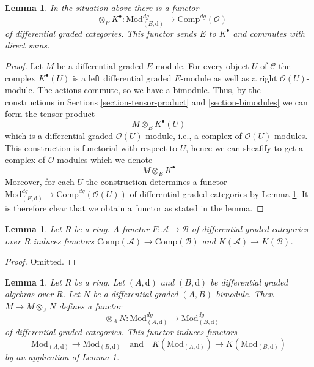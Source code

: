 \documentclass{stacks-project}
\theoremstyle{plain}
\newtheorem{lemma}[subsection]{Lemma}
\theoremstyle{definition}
\theoremstyle{remark}
\numberwithin{equation}{subsection}
\begin{document}
\begin{lemma}
\label{lemma-tensor-with-complex}
In the situation above there is a functor
$$
- \otimes_E K^\bullet :
\text{Mod}^{dg}_{(E, \text{d})}
\longrightarrow
\text{Comp}^{dg}(\mathcal{O})
$$
of differential graded categories. This functor sends $E$ to $K^\bullet$
and commutes with direct sums.
\end{lemma}

\begin{proof}
Let $M$ be a differential graded $E$-module. For every object $U$ of
$\mathcal{C}$ the complex $K^\bullet(U)$ is a left differential
graded $E$-module as well as a right $\mathcal{O}(U)$-module.
The actions commute, so we have a bimodule.
Thus, by the constructions in
Sections \ref{section-tensor-product} and \ref{section-bimodules}
we can form the tensor product
$$
M \otimes_E K^\bullet(U)
$$
which is a differential graded $\mathcal{O}(U)$-module, i.e., a complex
of $\mathcal{O}(U)$-modules. This construction is functorial with respect
to $U$, hence we can sheafify to get a complex of $\mathcal{O}$-modules
which we denote
$$
M \otimes_E K^\bullet
$$
Moreover, for each $U$ the construction determines a functor
$\text{Mod}^{dg}_{(E, \text{d})} \to \text{Comp}^{dg}(\mathcal{O}(U))$
of differential graded categories by Lemma \ref{lemma-tensor}.
It is therefore clear that we obtain a functor as stated in the lemma.
\end{proof}

\begin{lemma}
\label{lemma-functorial}
Let $R$ be a ring. A functor $F : \mathcal{A} \to \mathcal{B}$
of differential graded categories over $R$ induces functors
$\text{Comp}(\mathcal{A}) \to \text{Comp}(\mathcal{B})$
and $K(\mathcal{A}) \to K(\mathcal{B})$.
\end{lemma}

\begin{proof}
Omitted.
\end{proof}

\begin{lemma}
\label{lemma-tensor}
Let $R$ be a ring. Let $(A, \text{d})$ and $(B, \text{d})$
be differential graded algebras over $R$. Let $N$ be a
differential graded $(A, B)$-bimodule. Then
$M \mapsto M \otimes_A N$ defines a functor
$$
- \otimes_A N :
\text{Mod}^{dg}_{(A, \text{d})}
\longrightarrow
\text{Mod}^{dg}_{(B, \text{d})}
$$
of differential graded categories. This functor induces functors
$$
\text{Mod}_{(A, \text{d})} \to \text{Mod}_{(B, \text{d})}
\quad\text{and}\quad
K(\text{Mod}_{(A, \text{d})}) \to K(\text{Mod}_{(B, \text{d})})
$$
by an application of Lemma \ref{lemma-functorial}.
\end{lemma}
\end{document}
